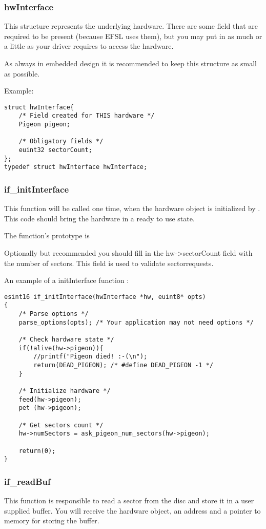 \subsubsection{hwInterface}
This structure represents the underlying hardware. There are some field that are required
to be present (because EFSL uses them), but you may put in as much or a little as
your driver requires to access the hardware.

As always in embedded design it is recommended to keep this structure as small
as possible.

Example:
\begin{lstlisting}
struct hwInterface{
	/* Field created for THIS hardware */
	Pigeon pigeon;

	/* Obligatory fields */
	euint32 sectorCount;
};
typedef struct hwInterface hwInterface;
\end{lstlisting}

\subsubsection{if\_initInterface}
This function will be called one time, when the hardware object is initialized by
. This code should bring the hardware in a ready to use state.

The function's prototype is\\

Optionally but recommended you should fill in the hw->sectorCount field with the number
of sectors. This field is used to validate sectorrequests.

An example of a initInterface function :
\begin{lstlisting}
esint16 if_initInterface(hwInterface *hw, euint8* opts)
{
	/* Parse options */
	parse_options(opts); /* Your application may not need options */

	/* Check hardware state */
	if(!alive(hw->pigeon)){
		//printf("Pigeon died! :-(\n");
		return(DEAD_PIGEON); /* #define DEAD_PIGEON -1 */
	}

	/* Initialize hardware */
	feed(hw->pigeon);
	pet (hw->pigeon);

	/* Get sectors count */
	hw->numSectors = ask_pigeon_num_sectors(hw->pigeon);

	return(0);
}
\end{lstlisting}

\subsubsection{if\_readBuf}
This function is responsible to read a sector from the disc and store it in a user supplied buffer. You will receive the hardware object, an address and a pointer to memory for storing
the buffer.


